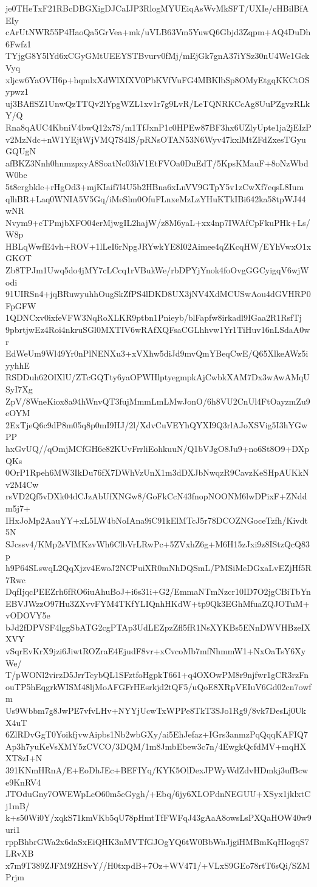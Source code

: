 je0THeTxF21RBcDBGXigDJCaIJP3RlogMYUEiqAsWvMkSFT/UXIe/cHBilBfAEIy
cArUtNWR55P4HaoQa5GrVea+mk/uVLB63Vm5YuwQ6Gbjd3Zqpm+AQ4DuDh6Fwfz1
TYjgG8Y5lYd6xCGyGMtUEEYSTBvurv0fMj/mEjGk7gnA37iYSz30nU4We1GckVyq
xljcw6YaOVH6p+hqmlxXdWlXfXV0PbKVfVuFG4MBKlbSp8OMyEtgqKKCtOSypwz1
uj3BAflSZ1UnwQzTTQv2lYpgWZL1xv1r7g9LvR/LeTQNRKCcAg8UuPZgvzRLkY/Q
Rna8qAUC4KbniV4bwQ12x7S/m1TfJxnP1c0HPEw87BF3hx6UZlyUpte1ja2jEIzP
v2MzNdc+nW1YEjtWjVMQ7S4IS/pRNsOTAN53N6Wyv47kxlMtZFdZxesTGyuGQUgN
afBKZ3Nnh0hnmzpxyA8SoatNc03hV1EtFVOa0DuEdT/5KpsKMauF+8oNzWbdW0be
5t8ergbkle+rHgOd3+mjKIaif7l4U5b2HBna6xLnVV9GTpY5v1zCwXf7eqsL8Ium
qlhBR+Laq0WNIA5V5Gq/iMeSlm0OfuFLnxeMzLzYHuKTkIBi642ka58tpWJ44wNR
Nvym9+cTPmjbXFO04erMjwgIL2hajW/z8M6yaL+xx4np7IWAfCpFkuPHk+Ls/W8p
HBLqWwfE4vh+ROV+1lLeI6rNpgJRYwkYE8I02Aimee4qZKcqHW/EYhVwxO1xGKOT
Zb8TPJm1Uwq5do4jMY7cLCcq1rVBukWe/rbDPYjYnok4foOvgGGCyigqV6wjWodi
91UIRSn4+jqBRuwyuhhOugSkZfPS4lDKD8UX3jNV4XdMCUSwAou4dGVHRP0FpGFW
1QDNCxv0ixfeVFW3NqRoXLKR9ptbn1Pnieyb/blFapfw8irkadl9IGaa2R1RsfTj
9pbrtjwEz4Roi4nkruSGl0MXTIV6wRAfXQFsaCGLhhvw1Yr1TiHuv16nLSdaA0wr
EdWeUm9Wl49Yr0nPlNENXu3+xVXhw5diJd9mvQmYBeqCwE/Q65XlkeAWz5iyyhhE
RSDDuh62OlXlU/ZTcGQTty6yaOPWHlptyegmpkAjCwbkXAM7Dx3wAwAMqUSyI7Xg
ZpV/8WneKiox8a94hWnvQT3fujMmmLmLMwJonO/6h8VU2CnUl4FtOayzmZu9eOYM
2ExTjeQ6c9dP8m05q8p0mI9HJ/2l/XdvCuVEYhQYXI9Q3rlAJoXSVig5I3hYGwPP
hxGvUQ//qOmjMCfGH6e82KUvFrrliEohkuuN/Q1bVJgO8Ju9+no6St8O9+DXpQKs
0OrP1Rpeh6MW3IkDu76fX7DWhVzUnX1m3dDXJbNwqzR9CavzKeSHpAUKkNv2M4Cw
rsVD2Qf5vDXk04dCJzAbUfXNGw8/GoFkCcN43fnopNOONM6lwDPixF+ZNddm5j7+
IHxJoMp2AauYY+xL5LW4bNoIAna9iC91kElMTcJ5r78DCOZNGoceTzfh/Kivdt5N
SJcssv4/KMp2sVlMKzvWh6ClbVrLRwPc+5ZVxhZ6g+M6H15zJxi9z8IStzQcQ83p
h9P64SLswqL2QqXjzv4EwoJ2NCPuiXR0mNhDQSmL/PMSiMeDGxaLvEZjHf5R7Rwc
DqfIjqcPEEZrh6fRO6iuAhuBoJ+i6s31i+G2/EmmaNTmNzcr10ID7O2jgCBiTbYn
EBVJWzzO97Hu3ZXvvFYM4TKfYLIQnhHKdW+tp9Qk3EGhMfuaZQJOTuM+vODOVY5e
bJd2fDPVSF4lggSbATG2cgPTAp3UdLEZpzZfl5fR1NsXYKBs5ENnDWVHBzeIXXVY
vSqrEvKrX9jzi6JiwtROZraE4EjudF8vr+xCvcoMb7mfNhmmW1+NxOaTsY6XyWe/
T/pWONl2virzD5JrrTcybQL1SFztfoHgpkT661+q4OXOwPM8r9njfwr1gCR3rzFn
ouTP5hEqgrkWISM48ljMoAFGFrHEsrkjd2tQF5/uQoE8XRpVEIuV6Gd02cn7owfm
Us9Wbbm7g8JwPE7vfvLHv+NYYjUcwTxWPPe8TkT3SJo1Rg9/8vk7DesLj0UkX4uT
6ZlRDvGgT0YoikfjvwAipbs1Nb2wbGXy/ai5EhJefaz+IGrs3anmzPqQqqKAFIQ7
Ap3h7yuKeVsXMY5zCVCO/3DQM/1m8JmbEbew3c7n/4EwgkQcfdMV+mqHXXT8zI+N
391KNmHRnA/E+EoDhJEc+BEFIYq/KYK5OlDexJPWyWdZdvHDmkj3ufBcwe9KnRV4
JTOduGny7OWEWpLcO60m5eGygh/+Ebq/6jy6XLOPdnNEGUU+XSyx1jklxtCj1mB/
k+s50Wi0Y/xqkS71kmVKb5qU78pHmtTfFWFqJ43gAaA8owsLsPXQaHOW40w9uri1
rppBhbrGWa2x6daSxEiQHK3nMVTfGJOgYQ6tW0BbWnJjgiHMBmKqHIogqS7LRvXB
x7m9T389ZJFM9ZHSvY//H0txpdB+7Oz+WV471/+VLxS9GEo78rtT6sQi/SZMPrjm
